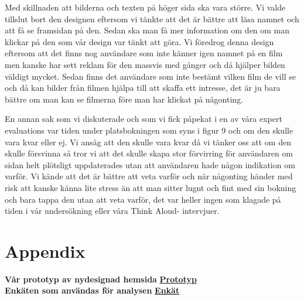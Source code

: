 \documentclass[swedish,a4paper,11pt]{article}
\begin{document}
Med skillnaden att bilderna och texten på höger sida ska vara större. Vi valde tillslut bort den designen eftersom vi tänkte att det är bättre att läsa namnet och att få se framsidan på den. Sedan ska man få mer information om den om man klickar på den som vår design var tänkt att göra. Vi föredrog denna design eftersom att det finns nog användare som inte känner igen namnet på en film men kanske har sett reklam för den massvis med gånger och då hjälper bilden väldigt mycket. Sedan finns det användare som inte bestämt vilken film de vill se och då kan bilder från filmen hjälpa till att skaffa ett intresse, det är ju bara bättre om man kan se filmerna före man har klickat på någonting.

En annan sak som vi diskuterade och som vi fick påpekat i en av våra expert evaluations var tiden under platsbokningen som syns i figur 9 och om den skulle vara kvar eller ej. Vi ansåg att den skulle vara kvar då vi tänker oss att om den skulle försvinna så tror vi att det skulle skapa stor förvirring för användaren om sidan helt plötsligt uppdaterades utan att användaren hade någon indikation om varför. Vi kände att det är bättre att veta varför och när någonting händer med risk att kanske känna lite stress än att man sitter lugnt och fint med sin bokning och bara tappa den utan att veta varför, det var heller ingen som klagade på tiden i vår undersökning eller våra Think Aloud- intervjuer.


\newpage
\section{Appendix}

\textbf{Vår prototyp av nydesignad hemsida} \hfill \textbf{\href{http://user.it.uu.se/~mise2899/home.html}{Prototyp}}\\
\textbf{Enkäten som användas för analysen} \hfill \textbf{\href{https://docs.google.com/forms/d/1KFDziZeg0wwAXTIV-LeV9eBy-Oa-SH1aR7GebkXLKKI/viewform?c=0&w=1}{Enkät}}
\end{document}
